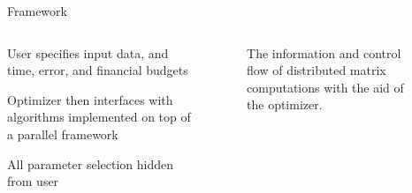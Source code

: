 \documentclass[final]{beamer}
\begin{document}
{\begin{frame}{}
\begin{center}
\begin{columns}[t]
\begin{column}{0.32\textwidth}
    \begin{block}{\huge Framework}
\vspace{.5cm}
\begin{columns}[t]
\begin{column}{0.45\textwidth}
\begin{itemize}{\Large
\item User specifies input data, and time, error, and financial budgets
\item Optimizer then interfaces with algorithms implemented on top of a parallel framework
\item All parameter selection hidden from user
}
\end{itemize}    
\end{column}
\begin{column}{.5\textwidth}
\begin{center}
\begin{figure}
\caption[width=\textwidth]{The information and control flow of distributed matrix computations with the aid of the optimizer.}
\end{figure}
\end{center}
\end{column}
\end{columns}
\end{block}


\end{column}
\end{columns}
\end{center}
\end{frame}}
\end{document}
